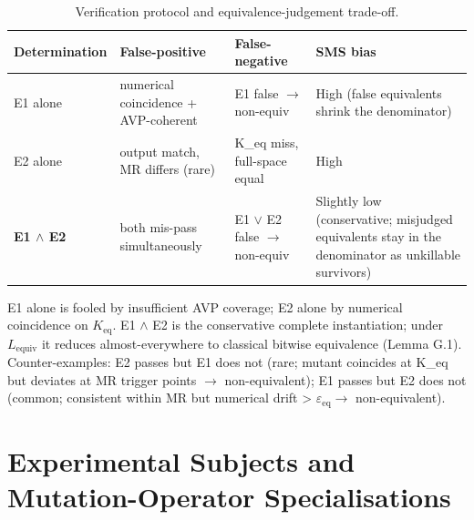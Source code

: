 \documentclass[manuscript,screen,review]{acmart}
\begin{document}
{%
\begin{longtable}[]{@{}
  >{\raggedright\arraybackslash}p{}
  >{\raggedright\arraybackslash}p{}
  >{\raggedright\arraybackslash}p{}
  >{\raggedright\arraybackslash}p{}@{}}
\caption{Verification protocol and equivalence-judgement trade-off.}\label{tab:p2-16}\\
\toprule\noalign{}
\begin{minipage}[b]{\linewidth}\raggedright
Determination
\end{minipage} & \begin{minipage}[b]{\linewidth}\raggedright
False-positive
\end{minipage} & \begin{minipage}[b]{\linewidth}\raggedright
False-negative
\end{minipage} & \begin{minipage}[b]{\linewidth}\raggedright
SMS bias
\end{minipage} \\
\midrule\noalign{}
\endfirsthead
\endhead
\bottomrule\noalign{}
\endlastfoot
E1 alone & numerical coincidence + AVP-coherent & E1 false $\to$ non-equiv &
High (false equivalents shrink the denominator) \\
E2 alone & output match, MR differs (rare) & K\_eq miss, full-space
equal & High \\
\textbf{E1 $\wedge$ E2} & both mis-pass simultaneously & E1 $\vee$ E2 false $\to$ non-equiv
& Slightly low (conservative; misjudged equivalents stay in the
denominator as unkillable survivors) \\
\end{longtable}
}

E1 alone is fooled by insufficient AVP coverage; E2 alone by numerical
coincidence on $K_{\mathrm{eq}}$. E1 $\wedge$ E2 is the conservative complete
instantiation; under $L_{\mathrm{equiv}}$ it reduces almost-everywhere to
classical bitwise equivalence (Lemma G.1). Counter-examples: E2 passes
but E1 does not (rare; mutant coincides at K\_eq but deviates at MR
trigger points $\to$ non-equivalent); E1 passes but E2 does not (common;
consistent within MR but numerical drift \textgreater{} $\varepsilon_{\mathrm{eq}} \to$
non-equivalent).


\section{Experimental Subjects and Mutation-Operator Specialisations}\label{b.-experimental-subjects-and-mutation-operator-specialisations}
\end{document}
